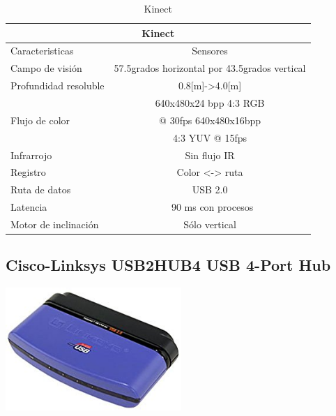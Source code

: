 \documentclass[a4paper]{book}
\begin{document}
\begin{table}[H]
\begin{center}
\begin{tabular}{|l|l|}%


\hline
\multicolumn{2}{|c|}{Kinect} \\ \hline %
Caracteristicas & \multicolumn{1}{|c|}{Sensores}\\ \hline
Campo de visión & \multicolumn{1}{|c|}{57.5grados horizontal por 43.5grados vertical}\\ \hline
Profundidad resoluble& \multicolumn{1}{|c|}{0.8[m]->4.0[m]}\\ \hline
\multirow{3}{1cm}{Flujo de color} & \multicolumn{1}{|c|}{640x480x24 bpp 4:3 RGB} \\  & \multicolumn{1}{|c|}{@ 30fps 640x480x16bpp} \\  & \multicolumn{1}{|c|}{4:3 YUV @ 15fps} \\  \hline
Infrarrojo & \multicolumn{1}{|c|}{Sin flujo IR}\\ \hline
Registro & \multicolumn{1}{|c|}{Color <-> ruta}\\ \hline
Ruta de datos & \multicolumn{1}{|c|}{USB 2.0}\\ \hline
Latencia & \multicolumn{1}{|c|}{~90 ms con procesos}\\ \hline
Motor de inclinación & \multicolumn{1}{|c|}{Sólo vertical}\\ \hline

\end{tabular}
\caption{Kinect}
\label{Datos del Kinect}
\end{center}
\end{table}

\subsection{Cisco-Linksys USB2HUB4 USB 4-Port Hub}

\begin{center}
\includegraphics[width=0.5\textwidth]{Figures/Hardware/Partes/Cisco-Linksys.png}
\label{fig:Hardware:Partes:Cisco}
\end{center}
\end{document}
